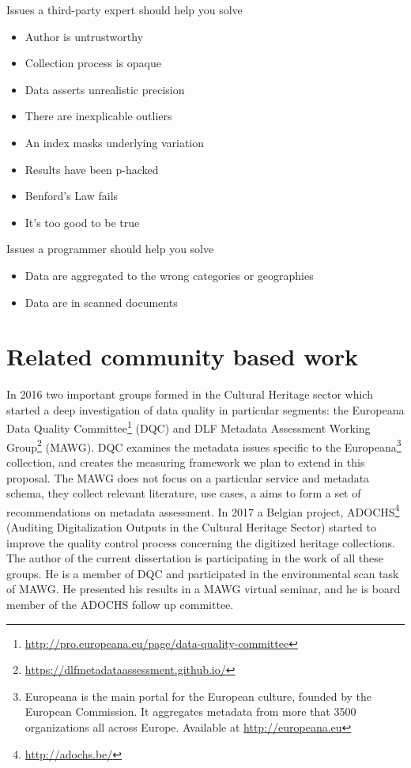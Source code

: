 Issues a third-party expert should help you solve
\begin{itemize}
 \setlength{\parskip}{0pt}
 \setlength{\itemsep}{0pt plus 1pt}
 \item Author is untrustworthy
 \item Collection process is opaque
 \item Data asserts unrealistic precision
 \item There are inexplicable outliers
 \item An index masks underlying variation
 \item Results have been p-hacked
 \item Benford’s Law fails
 \item It’s too good to be true
\end{itemize}

Issues a programmer should help you solve
\begin{itemize}
 \setlength{\parskip}{0pt}
 \setlength{\itemsep}{0pt plus 1pt}
 \item Data are aggregated to the wrong categories or geographies
 \item Data are in scanned documents
\end{itemize}

\section{Related community based work}

In 2016 two important groups formed in the Cultural Heritage sector which started a deep investigation of data quality in particular segments: the Europeana Data Quality Committee\footnote{\url{http://pro.europeana.eu/page/data-quality-committee}} (DQC) and DLF Metadata Assessment Working Group\footnote{\url{https://dlfmetadataassessment.github.io/}} (MAWG). DQC examines the metadata issues specific to the Europeana\footnote{Europeana is the main portal for the European culture, founded by the European Commission. It aggregates metadata from more that 3500 organizations all across Europe. Available at \url{http://europeana.eu}} collection, and creates the measuring framework we plan to extend in this proposal. The MAWG does not focus on a particular service and metadata schema, they collect relevant literature, use cases, a aims to form a set of recommendations on metadata assessment. In 2017 a Belgian project, ADOCHS\footnote{\url{http://adochs.be/}} (Auditing Digitalization Outputs in the Cultural Heritage Sector) started to improve the quality control process concerning the digitized heritage collections. The author of the current dissertation is participating in the work of all these groups. He is a member of DQC and participated in the environmental scan task of MAWG. He presented his results in a MAWG virtual seminar, and he is board member of the ADOCHS follow up committee.

